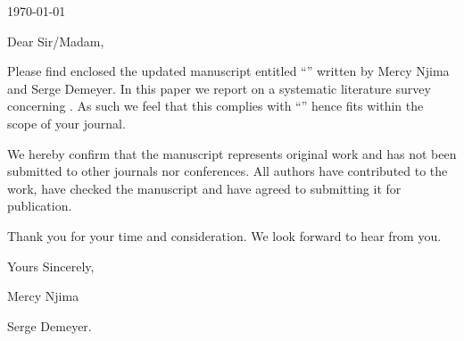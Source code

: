 
\begin{flushright}
\today
\end{flushright}

\vspace{1em}
\noindent
Dear Sir/Madam,

\vspace{1em}

Please find enclosed the updated manuscript entitled ``\paperTitle'' written by Mercy Njima and Serge Demeyer.
In this paper we report on a systematic literature survey concerning \tofix{\ldots}.
As such we feel that this complies with ``\tofix{[\ldots]}'' hence fits within the scope of your journal.

We hereby confirm that the manuscript represents original work and has not been submitted to other journals nor conferences.
All authors have contributed to the work, have checked the manuscript and have agreed to submitting it for publication.


\vspace{1em}
\noindent
Thank you for your time and consideration.
We look forward to hear from you.


\vspace{2em}
\noindent
Yours Sincerely,

\vspace{1em}

\noindent
Mercy Njima

\noindent
Serge Demeyer.